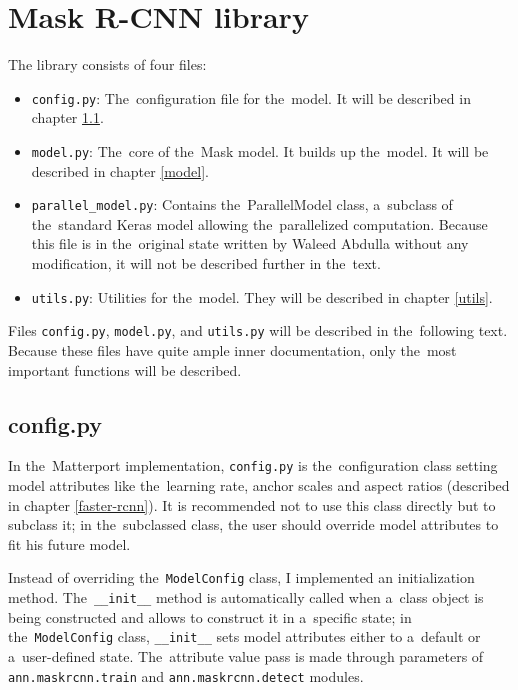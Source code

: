 \section{Mask R-CNN library}
\label{library}

The library consists of four files:
\begin{itemize}
	 \item \verb|config.py|: The~configuration file for the~model. It will be
	 described in chapter \ref{config}.
	 \item \verb|model.py|: The~core of the~Mask  model. It builds up
	 the~model. It will be described in chapter \ref{model}.
	 \item \verb|parallel_model.py|: Contains the~ParallelModel class, a~subclass
	 of the~standard Keras model allowing the~parallelized computation. Because
	 this file is in the~original state written by Waleed Abdulla without any
	 modification, it will not be described further in the~text.
	 \item \verb|utils.py|: Utilities for the~model. They will be described in
	 chapter \ref{utils}.
\end{itemize}

Files \verb|config.py|, \verb|model.py|, and \verb|utils.py| will be described 
in the~following text. Because these files have quite ample inner documentation, 
only the~most important functions will be described.

\subsection{config.py}
\label{config}

In the~Matterport implementation, \verb|config.py| is the~configuration class 
setting model attributes like the~learning rate,  anchor scales and 
aspect ratios (described in chapter \ref{faster-rcnn}). It is recommended not to 
use this class directly but to subclass it; in the~subclassed class, the user should 
override model attributes to fit his future model.

Instead of overriding the~\verb|ModelConfig| class, I implemented an 
initialization method. The~\verb|__init__| method is automatically called when
a~class object is being constructed and allows to construct it in a~specific 
state; in the~\verb|ModelConfig| class, \verb|__init__| sets model attributes 
either to a~default or a~user-defined state. The~attribute value pass is made 
through parameters of \verb|ann.maskrcnn.train| and \verb|ann.maskrcnn.detect| 
modules.

